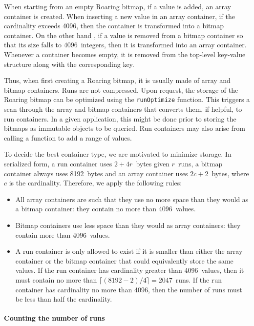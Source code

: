 \documentclass[times]{speauth}
\begin{document}
When starting from an empty Roaring  bitmap, if a value is added, an array container is created.
When inserting a new value in an array container, if the cardinality exceeds \num{4096},
then the container is transformed into a bitmap container. 
On the other hand%
, if a value is removed from a bitmap container so that its size falls to \num{4096}~integers,
 then it is transformed into an array container. Whenever a container becomes empty, it is removed
from the top-level key-value structure
along with the corresponding key.


Thus, when first creating a Roaring  bitmap, it is usually made of array and bitmap containers. Runs are not compressed.
Upon request,
the storage of the Roaring 
bitmap can
be optimized using the \texttt{runOptimize} function.
This triggers a scan
through the array and bitmap containers
that converts them, if helpful,
to run containers. In a given application, this might be done
prior to storing the bitmaps as immutable objects to be queried.
Run containers may also arise
from calling
a function to   add a range of values.

To decide the best container type, we are motivated to minimize storage.
In serialized form, a run container uses $2+4r$~bytes given $r$~runs, a bitmap container always uses \num{8192}~bytes and an array container uses $2c+2$~bytes, where $c$ is the cardinality.
Therefore, we apply the following rules:
\begin{itemize}
\item All array containers are such that they use no more space than they would as a bitmap container: they contain no more  than \num{4096}~values.
\item Bitmap containers use less space than they would as array containers: they contain more than \num{4096}~values.
\item A run container is only allowed to exist if it is smaller than either the array container or the bitmap container that could equivalently store the same values.  If the run container has cardinality greater than \num{4096}~values, then it must contain no more than $\lceil (8192-2)/4 \rceil = 2047$~runs. If the run container has cardinality no more than \num{4096}, then the number of runs must be less than half the cardinality.
\end{itemize}

\paragraph{Counting the number of runs}
\end{document}
